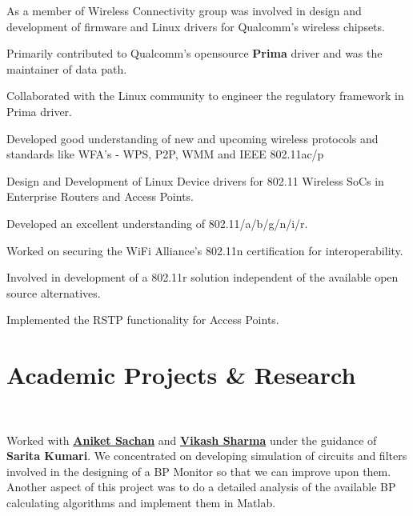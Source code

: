 \documentclass[letterpaper]{deedy-resume} %
\begin{document}
\begin{minipage}[t]{0.74\textwidth}
\begin{tightitemize}
\item As a member of Wireless Connectivity group was involved in design and development of firmware and Linux drivers for Qualcomm's wireless chipsets.
\item Primarily contributed to Qualcomm's opensource \textbf{Prima} driver and was the maintainer of data path.
\item Collaborated with the Linux community to engineer the regulatory framework in Prima driver.
\item Developed good understanding of new and upcoming wireless protocols and standards like WFA's - WPS, P2P, WMM and IEEE 802.11ac/p
\end{tightitemize}

\sectionspace %



\begin{tightitemize}
\item Design and Development of Linux Device drivers for 802.11 Wireless SoCs in Enterprise Routers and Access Points.
\item Developed an excellent understanding of 802.11/a/b/g/n/i/r.
\item Worked on securing the WiFi Alliance's 802.11n certification for interoperability.
\item Involved in development of a 802.11r solution independent of the available open source alternatives.
\item Implemented the RSTP functionality for Access Points.
\end{tightitemize}

\sectionspace %


\section{Academic Projects \& Research}

 \\
\begin{tightitemize}
\item[] Worked with \textbf{\href{http://in.linkedin.com/in/aniketsachan}{Aniket Sachan}} and \textbf{\href{http://in.linkedin.com/pub/vikash-sharma/16/865/aba}{Vikash Sharma}} under the guidance of \textbf{Sarita Kumari}. We concentrated on developing simulation of circuits and filters involved in the designing of a BP Monitor so that we can improve upon them. Another aspect of this project was to do a detailed analysis of the available BP calculating algorithms and implement them in Matlab.
\end{tightitemize}


\end{minipage}
\end{document}
